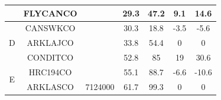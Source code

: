 \begin{table}[htbp]
\begin{tabular}{ccccccc}
	                                                  &   FLYCANCO   &              & 29.3 &           47.2            & 9.1  &            14.6            \\ \midrule
	               \multirow{3}{*}{D}                 &   CANSWKCO   &              & 30.3 &           18.8            & -3.5 &            -5.6            \\
	                                                  &   ARKLAJCO   &              & 33.8 &           54.4            &  0   &             0              \\
	                                                  &   CONDITCO   &              & 52.8 &            85             &  19  &            30.6            \\ \midrule
	               \multirow{2}{*}{E}                 &   HRC194CO   &              & 55.1 &           88.7            & -6.6 &           -10.6            \\
	                                                  &   ARKLASCO   &   7124000    & 61.7 &           99.3            &  0   &             0              \\ \bottomrule
\end{tabular}
\end{table}

